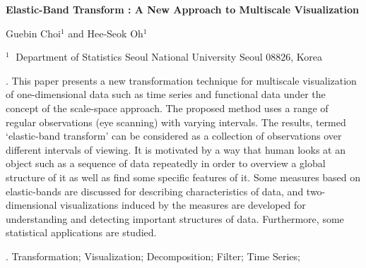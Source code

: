 \documentclass[12pt]{article}
\begin{document}
\begin{flushleft}


{\LARGE\bf Elastic-Band Transform
	: A New Approach to Multiscale Visualization}


\vspace{1.0cm}

Guebin Choi$^1$ and Hee-Seok Oh$^1$

\begin{description}

\item $^1 \;$ Department of Statistics Seoul National University Seoul 08826, Korea

\end{description}

\end{flushleft}


\vspace{0.75cm}

. This paper presents a new transformation technique for multiscale visualization of one-dimensional data such as time series and functional data under the concept of the scale-space approach. The proposed method uses a range of regular observations (eye scanning) with varying intervals. The results, termed `elastic-band transform' can be considered as a collection of observations over different intervals of viewing. It is motivated by a way that human looks at an object such as a sequence of data repeatedly in order to overview a global structure of it as well as find some specific features of it.  Some measures based on elastic-bands are discussed for describing characteristics of data, and two-dimensional visualizations induced by the measures are developed for understanding and detecting important structures of data. Furthermore, some statistical applications are studied.   
\vskip 2mm

.
 Transformation; Visualization; Decomposition; Filter; Time Series;
\end{document}
